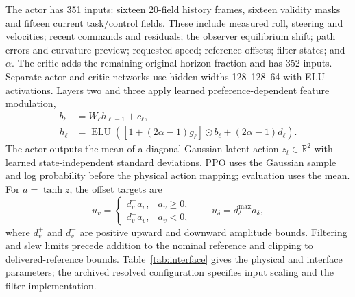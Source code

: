The actor has 351 inputs: sixteen 20-field history frames, sixteen validity masks and fifteen current task/control fields. These include measured roll, steering and velocities; recent commands and residuals; the observer equilibrium shift; path errors and curvature preview; requested speed; reference offsets; filter states; and $\alpha$. The critic adds the remaining-original-horizon fraction and has 352 inputs. Separate actor and critic networks use hidden widths 128--128--64 with ELU activations. Layers two and three apply learned preference-dependent feature modulation,
\begin{equation}
\begin{split}
 b_\ell&=W_\ell h_{\ell-1}+c_\ell,\\
 h_\ell&=\operatorname{ELU}\!\left([1+(2\alpha-1)g_\ell]\odot b_\ell
 +(2\alpha-1)d_\ell\right).
\end{split}
\label{eq:modulation}
\end{equation}
The actor outputs the mean of a diagonal Gaussian latent action $z_t\in\mathbb R^2$ with learned state-independent standard deviations. PPO uses the Gaussian sample and log probability before the physical action mapping; evaluation uses the mean. For $a=\tanh z$, the offset targets are
\begin{equation}
 u_v=\begin{cases}d_v^+a_v,&a_v\ge0,\\d_v^-a_v,&a_v<0,\end{cases}
 \qquad u_\delta=d_\delta^{\max}a_\delta,
\label{eq:offset}
\end{equation}
where $d_v^+$ and $d_v^-$ are positive upward and downward amplitude bounds. Filtering and slew limits precede addition to the nominal reference and clipping to delivered-reference bounds. Table~\ref{tab:interface} gives the physical and interface parameters; the archived resolved configuration specifies input scaling and the filter implementation.

